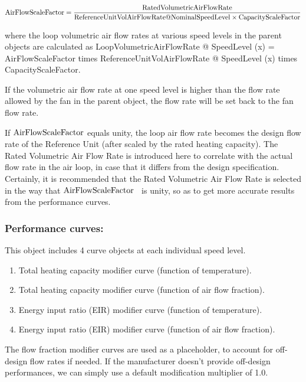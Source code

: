 \begin{equation}
{\rm{AirFlowScaleFactor}} = \frac{{{\rm{RatedVolumetricAirFlowRate}}}}{{{\rm{ReferenceUnitVolAirFlowRate}}@{\rm{NominalSpeedLevel}} \times {\rm{CapacityScaleFactor}}}}
\end{equation}

where the loop volumetric air flow rates at various speed levels in the parent objects are calculated as LoopVolumetricAirFlowRate @ SpeedLevel (x) = AirFlowScaleFactor times ReferenceUnitVolAirFlowRate @ SpeedLevel (x) times CapacityScaleFactor.

If the volumetric air flow rate at one speed level is higher than the flow rate allowed by the fan in the parent object, the flow rate will be set back to the fan flow rate.

If \({\rm{AirFlowScaleFactor}}\) equals unity, the loop air flow rate becomes the design flow rate of the Reference Unit (after scaled by the rated heating capacity). The Rated Volumetric Air Flow Rate is introduced here to correlate with the actual flow rate in the air loop, in case that it differs from the design specification. Certainly, it is recommended that the Rated Volumetric Air Flow Rate is selected in the way that \({\rm{AirFlowScaleFactor}}\) ~is unity, so as to get more accurate results from the performance curves.

\subsubsection{Performance curves:}\label{performance-curves-201605050922}

This object includes 4 curve objects at each individual speed level.

\begin{enumerate}
\item Total heating capacity modifier curve (function of temperature).
\item Total heating capacity modifier curve (function of air flow fraction).
\item Energy input ratio (EIR) modifier curve (function of temperature).
\item Energy input ratio (EIR) modifier curve (function of air flow fraction).
\end{enumerate}

The flow fraction modifier curves are used as a placeholder, to account for off-design flow rates if needed. If the manufacturer doesn't provide off-design performances, we can simply use a default modification multiplier of 1.0.

